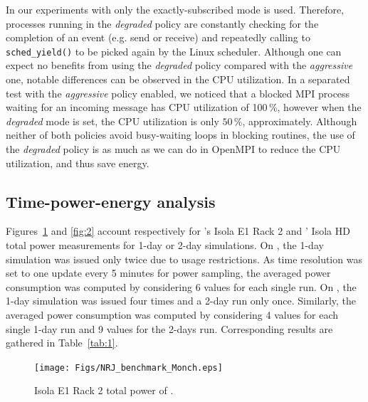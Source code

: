 In our experiments with \cosmoart only the exactly-subscribed mode  is
used. Therefore, \cosmoart processes running  in  the  \emph{degraded} 
policy are constantly checking for the completion  of  an  event (e.g. 
send or receive) and repeatedly calling to  \texttt{sched\_yield()} to 
be picked again by the Linux scheduler. Although one can expect no benefits 
from   using   the  \emph{degraded}   policy   compared   with     the 
\emph{aggressive} one, notable differences can be observed in the CPU utilization. 
In a separated  test  with  the  \emph{aggressive}  policy 
enabled, we noticed that a blocked MPI process waiting for an incoming 
message has CPU utilization of 100\,\%,  however  when  the \emph{degraded} 
mode  is  set,  the  CPU  utilization is only $50\,\%$, approximately. 
Although neither of both policies avoid busy-waiting loops in blocking 
routines, the use of the \emph{degraded} policy is as much as we can 
do in OpenMPI to reduce the CPU utilization, and thus save energy.


\subsection{Time-power-energy analysis}
\label{subsec:4.2}

Figures~\ref{fig:1} and \ref{fig:2}  account respectively for \monch's
Isola  E1 Rack 2  and \pilat'  Isola HD  total power  measurements for
1-day or 2-day simulations. On \monch, the 1-day simulation was issued
only twice due  to usage restrictions.  As time  resolution was set to
one  update every  5 minutes  for power  sampling, the  averaged power
consumption was computed by considering  6 values for each single run.
On \pilat, the 1-day simulation was  issued four times and a 2-day run
only once.  Similarly, the  averaged power consumption was computed by
considering 4  values for each single  1-day run and 9  values for the
2-days run. Corresponding results are gathered in Table~\ref{tab:1}.

\begin{figure}[htbf]
  \centering
  \texttt{[image: Figs/NRJ\_benchmark\_Monch.eps]}
  \caption{Isola E1 Rack 2 total power of \monch.}
  \label{fig:1}
\end{figure}


